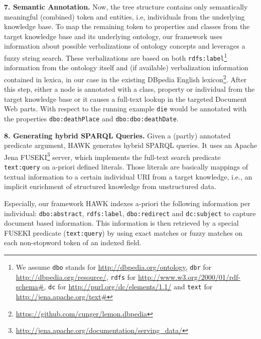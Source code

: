 \textbf{7. Semantic Annotation.}
Now, the tree structure contains only semantically meaningful (combined) token and entities, i.e, individuals from the underlying knowledge base. 
To map the remaining token to properties and classes from the target knowledge base and its underlying ontology, our framework uses information about possible verbalizations of ontology concepts and leverages a fuzzy string search.
These verbalizations are based on both \texttt{rdfs:label}\footnote{We assume \texttt{dbo} stands for \url{http://dbpedia.org/ontology}, \texttt{dbr} for \url{http://dbpedia.org/resource/}, \texttt{rdfs} for \url{http://www.w3.org/2000/01/rdf-schema\#}, \texttt{dc} for \url{http://purl.org/dc/elements/1.1/} and \texttt{text} for \url{http://jena.apache.org/text\#} } information from the ontology itself and (if available) verbalization information contained in lexica, in our case in the existing DBpedia English lexicon\footnote{\url{https://github.com/cunger/lemon.dbpedia}}.
After this step, either a node is annotated with a class, property or individual from the target knowledge base or it causes a full-text lookup in the targeted Document Web parts.
With respect to the running example \texttt{die} would be annotated with the properties \texttt{dbo:deathPlace} and \texttt{dbo:dbo:deathDate}.

\textbf{8. Generating hybrid SPARQL Queries.}
Given a (partly) annotated predicate argument, HAWK generates hybrid SPARQL queries.
It uses an Apache Jena FUSEKI\footnote{\url{http://jena.apache.org/documentation/serving_data/}} server, which implements the full-text search predicate \texttt{text:query} on a-priori defined literals. 
Those literals are basically mappings of textual information to a certain individual URI from a target knowledge, i.e., an implicit enrichment of structured knowledge from unstructured data. 

Especially, our framework HAWK indexes a-priori the following information per individual: \texttt{dbo:abstract}, \texttt{rdfs:label}, \texttt{dbo:redirect} and \texttt{dc:subject} to capture document based information.
This information is then retrieved by a special FUSEKI predicate (\texttt{text:query}) by using exact matches or fuzzy matches on each non-stopword token of an indexed field.

